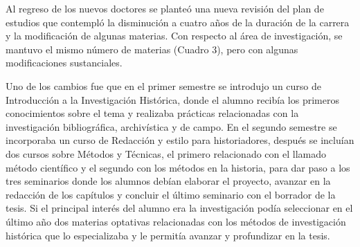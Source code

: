 Al regreso de los nuevos doctores se planteó una nueva revisión del 
plan de estudios que contempló la disminución a cuatro años de la duración 
de la carrera y la modificación de algunas materias. Con respecto al área  de 
investigación, se mantuvo el mismo número de materias (Cuadro 3), pero con 
algunas modificaciones sustanciales.

Uno de los cambios fue que en el primer semestre se introdujo un curso 
de Introducción a la Investigación Histórica, donde el alumno recibía 
los primeros conocimientos sobre el tema y realizaba prácticas 
relacionadas con la investigación bibliográfica, archivística y de 
campo. En el segundo semestre se incorporaba un curso de Redacción y 
estilo para historiadores, después se incluían dos cursos sobre Métodos 
y Técnicas, el primero relacionado con el llamado método científico y 
el segundo con los métodos en la historia, para dar paso a los tres 
seminarios donde los alumnos debían elaborar el proyecto, avanzar en la 
redacción de los capítulos y concluir el último seminario con el 
borrador de la tesis. Si el principal interés del alumno era la 
investigación podía seleccionar en el último año dos materias optativas 
relacionadas con los métodos de investigación histórica que lo 
especializaba y le permitía avanzar y profundizar en la tesis. 

